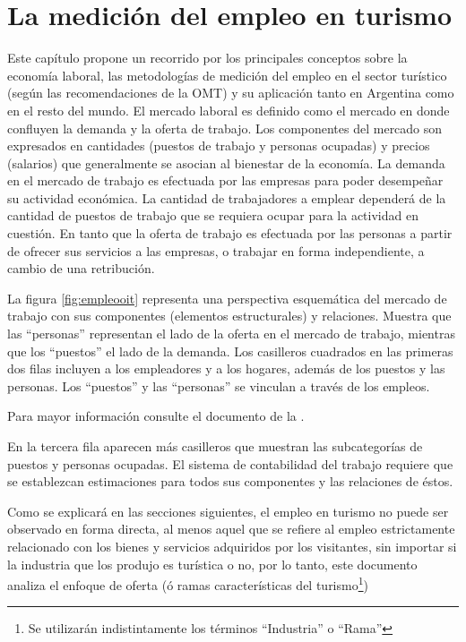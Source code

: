 \documentclass[
  openany]{book}
\begin{document}
\hypertarget{medicion-empleo}{%
\chapter{\texorpdfstring{\textbf{La medición del empleo en turismo}}{La medición del empleo en turismo}}\label{medicion-empleo}}

Este capítulo propone un recorrido por los principales conceptos sobre la economía laboral, las metodologías de medición del empleo en el sector turístico (según las recomendaciones de la OMT) y su aplicación tanto en Argentina como en el resto del mundo.
El mercado laboral es definido como el mercado en donde confluyen la demanda y la oferta de trabajo. Los componentes del mercado son expresados en cantidades (puestos de trabajo y personas ocupadas) y precios (salarios) que generalmente se asocian al bienestar de la economía.
La demanda en el mercado de trabajo es efectuada por las empresas para poder desempeñar su actividad económica. La cantidad de trabajadores a emplear dependerá de la cantidad de puestos de trabajo que se requiera ocupar para la actividad en cuestión.
En tanto que la oferta de trabajo es efectuada por las personas a partir de ofrecer sus servicios a las empresas, o trabajar en forma independiente, a cambio de una retribución.

La figura \ref{fig:empleooit} representa una perspectiva esquemática del mercado de trabajo con sus componentes (elementos estructurales) y relaciones. Muestra que las ``personas'' representan el lado de la oferta en el mercado de trabajo, mientras que los ``puestos'' el lado de la demanda. Los casilleros cuadrados en las primeras dos filas incluyen a los empleadores y a los hogares, además de los puestos y las personas. Los ``puestos'' y las ``personas'' se vinculan a través de los empleos.

Para mayor información consulte el documento de la \citet{oit2014}.

En la tercera fila aparecen más casilleros que muestran las subcategorías de puestos y personas ocupadas. El sistema de contabilidad del trabajo requiere que se establezcan estimaciones para todos sus componentes y las relaciones de éstos.

Como se explicará en las secciones siguientes, el empleo en turismo no puede ser observado en forma directa, al menos aquel que se refiere al empleo estrictamente relacionado con los bienes y servicios adquiridos por los visitantes, sin importar si la industria que los produjo es turística o no, por lo tanto, este documento analiza el enfoque de oferta (ó ramas características del turismo\footnote{Se utilizarán indistintamente los términos ``Industria'' o ``Rama''})
\end{document}
